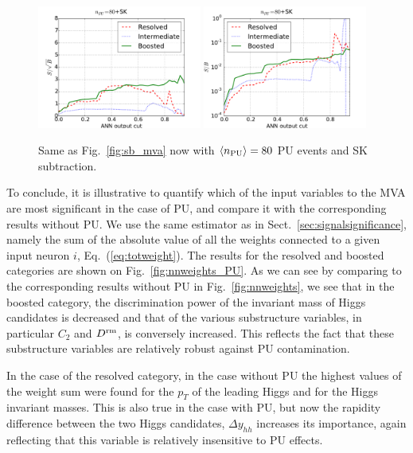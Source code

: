 \begin{figure}[t]
\begin{center}
\includegraphics[width=0.48\textwidth]{plots/ssb_SKPU80.pdf}
\includegraphics[width=0.48\textwidth]{plots/sb_SKPU80.pdf}
\caption{\small Same as Fig.~\ref{fig:sb_mva}
  now
  with  $\left\langle n_{\rm PU}\right\rangle=80$ PU events 
  and SK subtraction.
}
\label{fig:sb_mva_PU}
\end{center}
\end{figure}

To conclude, it is illustrative to quantify which of the input variables
to the MVA are most significant in the case of PU,
and compare it with the corresponding
results without PU.
%
We use the same estimator as in Sect.~\ref{sec:signalsignificance},
namely the sum
of the absolute value of all the weights connected to a given
input neuron $i$, Eq.~(\ref{eq:totweight}).
%
The results for the resolved and boosted categories are shown
on Fig.~\ref{fig:nnweights_PU}.
%
As we can see by comparing to the corresponding
results without PU in Fig.~\ref{fig:nnweights}, we see that
in the boosted category, the discrimination power of the invariant
mass of Higgs candidates is decreased and that of the various substructure
variables, in particular $C_2$ and $D^{{\rm rm}}$, is conversely
increased.
%
This reflects the fact that these substructure variables are
relatively robust against PU contamination.

In the case of the resolved category, in the case without PU the highest
values of the weight sum were found for the $p_T$ of the leading
Higgs and for the Higgs invariant masses.
%
This is also true in the case with PU, but now the rapidity difference
between the two Higgs candidates, $\Delta y_{hh}$ increases its
importance, again reflecting that this variable is relatively
insensitive to PU effects.

